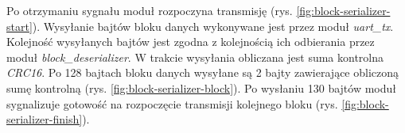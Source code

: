 Po otrzymaniu sygnału  moduł rozpoczyna transmisję (rys. \ref{fig:block-serializer-start}). Wysyłanie bajtów bloku danych wykonywane jest przez moduł \textit{uart\_tx}. Kolejność wysyłanych bajtów jest zgodna z kolejnością ich odbierania przez moduł \textit{block\_deserializer}. W trakcie wysyłania obliczana jest suma kontrolna \textit{CRC16}. Po 128 bajtach bloku danych wysyłane są 2 bajty zawierające obliczoną sumę kontrolną (rys. \ref{fig:block-serializer-block}). Po wysłaniu 130 bajtów moduł sygnalizuje gotowość na rozpoczęcie transmisji kolejnego bloku  (rys. \ref{fig:block-serializer-finish}).

\begin{center}
\centering
{}
\label{fig:block-serializer-start}
\end{center}

\begin{center}
\centering
{}
\label{fig:block-serializer-block}
\end{center}

